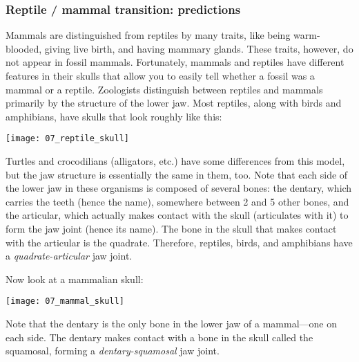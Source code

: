 \documentclass[12pt, hidelinks]{exam}
\begin{document}
\begin{questions}

\newpage

\subsubsection*{Reptile / mammal transition: predictions}

Mammals are distinguished from reptiles by many traits, like being warm-blooded, giving live birth, and having mammary glands. These traits, however, do not appear in fossil mammals. Fortunately, mammals and reptiles have different features in their skulls that allow you to easily tell whether a fossil was a mammal or a reptile.  Zoologists distinguish between reptiles and mammals primarily by the structure of the lower jaw.  Most reptiles, along with birds and amphibians, have skulls that look roughly like this:

\begin{center}\texttt{[image: 07\_reptile\_skull]}\end{center}

Turtles and crocodilians (alligators, etc.) have some differences from this model, but the jaw structure is essentially the same in them, too.  Note that each side of the lower jaw in these organisms is composed of several bones:  the dentary, which carries the teeth (hence the name), somewhere between 2 and 5 other bones, and the articular, which actually makes contact with the skull (articulates with it) to form the jaw joint (hence its name).  The bone in the skull that makes contact with the articular is the quadrate.  Therefore, reptiles, birds, and amphibians have a \emph{quadrate-articular} jaw joint.  

Now look at a mammalian skull:

	\begin{center}\texttt{[image: 07\_mammal\_skull]} \end{center}
	
Note that the dentary is the only bone in the lower jaw of a mammal—one on each side.  The dentary makes contact with a bone in the skull called the squamosal, forming a \emph{dentary-squamosal} jaw joint. 


\end{questions}
\end{document}

